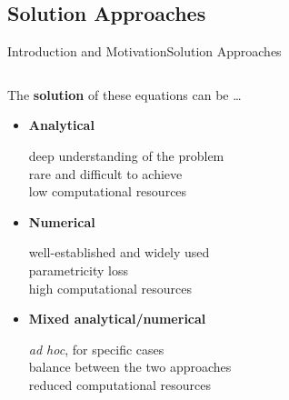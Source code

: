 \subsection{Solution Approaches}

\begin{frame}{Introduction and Motivation}{Solution Approaches}
  \begin{columns}
    \begin{column}[c]{0.45\textwidth}
      The \textbf{solution} of these equations can be \dots \\
      \begin{itemize}[<+->]
        \item \textbf{Analytical} \\
        \begin{small}
          \qquad \textcolor{mycolor2!95!black}{deep understanding of the problem} \\
          \qquad \textcolor{mycolor2!95!black}{rare and difficult to achieve} \\
          \qquad \textcolor{mycolor5!95!black}{low computational resources}
        \end{small}
        \item \textbf{Numerical} \\
        \begin{small}
          \qquad \textcolor{mycolor5!95!black}{well-established and widely used} \\
          \qquad \textcolor{mycolor3!95!black}{parametricity loss} \\
          \qquad \textcolor{mycolor2!95!black}{high computational resources}
        \end{small}
        \item \textbf{Mixed analytical/numerical} \\
        \begin{small}
          \qquad \textcolor{mycolor3!95!black}{\emph{ad hoc}, for specific cases} \\
          \qquad \textcolor{mycolor5!95!black}{balance between the two approaches} \\
          \qquad \textcolor{mycolor5!95!black}{reduced computational resources}
        \end{small}
      \end{itemize}
    \end{column}
    \begin{column}[c]{0.6\textwidth}
      \centering
      \small
      \vspace{-2.0em}

\end{column}
\end{columns}
\end{frame}

